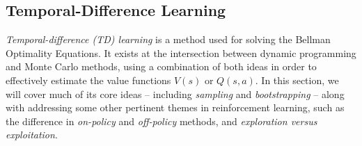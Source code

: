 \subsection{Temporal-Difference Learning}
\label{subsec:2_TD_learning}

\textit{Temporal-difference (TD) learning} is a method used for solving the Bellman Optimality Equations. It exists at the intersection between dynamic programming and Monte Carlo methods, using a combination of both ideas in order to effectively estimate the value functions $V(s)$ or $Q(s, a)$. In this section, we will cover much of its core ideas -- including \textit{sampling} and \textit{bootstrapping} -- along with addressing some other pertinent themes in reinforcement learning, such as the difference in \textit{on-policy} and \textit{off-policy} methods, and \textit{exploration versus exploitation}.


